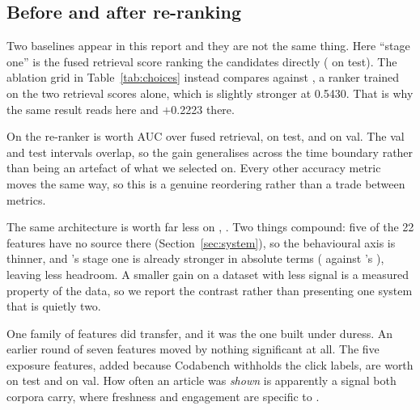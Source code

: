 \subsection{Before and after re-ranking}
\label{sec:beforeafter}

\begin{table}[t]
\centering\scriptsize

\caption{All accuracy metrics on the test split, with 95\% bootstrap intervals beneath each mean.
``Stage one'' rows are the retrieval scores ranking the same candidates; the re-ranker reorders
them. $^\ast$Lifetime popularity is not available at serving time and is reported only to price
what it would buy (Section~\ref{sec:q9}). Validation-split figures are in Appendix~\ref{app:val}.}
\label{tab:overall}
\end{table}

Two baselines appear in this report and they are not the same thing. Here ``stage one'' is the fused retrieval score ranking the candidates directly (\EBFusedTest{} on test). The
ablation grid in Table~\ref{tab:choices} instead compares against , a ranker
trained on the two retrieval scores alone, which is slightly stronger at 0.5430. That is why the
same result reads \EBGainTest{} here and $+$0.2223 there.

On \eb{} the re-ranker is worth \EBGainTest{} AUC over fused retrieval, \EBGainTestCI{} on test, and \EBGainVal{} \EBGainValCI{} on val. The val and test intervals
overlap, so the gain generalises across the time boundary rather than being an artefact of what we
selected on. Every other accuracy metric moves the same way, so this is a genuine reordering rather
than a trade between metrics.

The same architecture is worth far less on \mind{}, \MDGainTest{} \MDGainTestCI{}. Two things
compound: five of the 22 features have no source there (Section~\ref{sec:system}), so the
behavioural axis is thinner, and \mind{}'s stage one is already stronger in absolute terms
(\MDFusedTest{} against \eb{}'s \EBFusedTest{}), leaving less headroom. A smaller gain on a dataset
with less signal is a measured property of the data, so we report the contrast rather than
presenting one system that is quietly two.

One family of features did transfer, and it was the one built under duress. An earlier round of seven features moved \mind{} by nothing significant at all. The five exposure features,
added because Codabench withholds the click labels, are worth \LadderExpMindTest{}
\LadderExpMindTestCI{} on \mind{} test and \LadderExpMindVal{} \LadderExpMindValCI{} on val. How
often an article was \emph{shown} is apparently a signal both corpora carry, where freshness and
engagement are specific to \eb{}.
